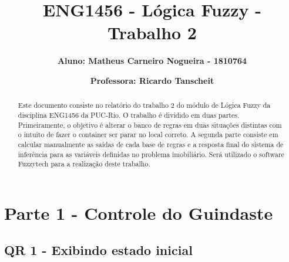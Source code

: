 \documentclass[12pt]{article}
\title{\textbf{ENG1456 - Lógica Fuzzy - Trabalho 2}}
\author{\textbf{Aluno: Matheus Carneiro Nogueira - 1810764}}
\affil{}
\author{\textbf{Professora: Ricardo Tanscheit}}
\affil{}
\date{}
\begin{document}
	\maketitle
	\tableofcontents
	

\begin{abstract}
	Este documento consiste no relatório do trabalho 2 do módulo de Lógica Fuzzy da disciplina ENG1456 da PUC-Rio. O trabalho é dividido em duas partes. Primeiramente, o objetivo é alterar o banco de regras em duas situações distintas com o intuito de fazer o container ser parar no local correto. A segunda parte consiste em calcular manualmente as saídas de cada base de regras e a resposta final do sistema de inferência para as variáveis definidas no problema imobiliário. Será utilizado o software Fuzzytech para a realização deste trabalho.
\end{abstract}

\section{Parte 1 - Controle do Guindaste}

\subsection{QR 1 - Exibindo estado inicial}
\end{document}
